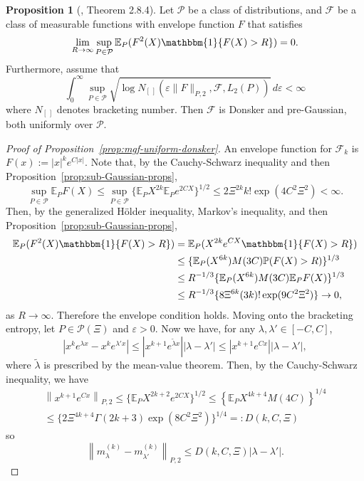 \documentclass{article}
\theoremstyle{definition}
\newtheorem{proposition}{Proposition}
\newcommand*\eps{\epsilon}
\renewcommand*\epsilon{\varepsilon}
\newcommand{\E}{\mathbb{E}}
\newcommand{\1}{\mathbbm{1}}
\renewcommand{\P}{\mathbb{P}}
\begin{document}
\begin{proposition}[\cite{vdv&w2012weak}, Theorem 2.8.4]
\label{prop:uniform-donkser}
    Let $\mathcal P$ be a class of distributions, and $\mathcal F$ be a class of measurable functions with envelope function $F$ that satisfies 
    \[
    \lim_{R \to \infty} \sup_{P \in \mathcal P} \E_P(F^2(X)\1\{F(X) > R\}) = 0.
    \]
    Furthermore, assume that 
    \[
    \int_0^\infty \sup_{P \in \mathcal P} \sqrt{\log N_{[\,]}(\eps \|F\|_{P, 2}, \mathcal F, L_2(P))} \, d\eps < \infty
    \]
    where $N_{[\,]}$ denotes bracketing number. Then $\mathcal F$ is Donsker and pre-Gaussian, both uniformly over $\mathcal P$.
\end{proposition}
\begin{proof}[Proof of Proposition~\ref{prop:mgf-uniform-donsker}]
    An envelope function for $\mathcal F_k$ is $F(x) := |x|^ke^{C|x|}$. Note that, by the Cauchy-Schwarz inequality and then Proposition~\ref{prop:sub-Gaussian-props},
    \[
    \sup_{P \in \mathcal P} \E_PF(X) \leq \sup_{P \in \mathcal P}\{\E_P X^{2k} \E_P e^{2CX}\}^{1/2} \leq 2\Xi^{2k}k! \exp(4C^2\Xi^2) < \infty.
    \]
    Then, by the generalized H\"older inequality, Markov's inequality, and then Proposition~\ref{prop:sub-Gaussian-props}, 
    \begin{align*}
        \E_P(F^2(X) \1\{F(X) > R\}) &= \E_P(X^{2k}e^{CX}\1\{F(X) > R\}) \\
        &\leq \{\E_P(X^{6k})M(3C)\P(F(X) > R)\}^{1/3} \\ 
        &\leq R^{-1/3} \{\E_P(X^{6k})M(3C)\E_P F(X)\}^{1/3} \\
        &\leq R^{-1/3}\{8\Xi^{6k}(3k)!\exp(9 C^2\Xi^2)\} \to 0,
    \end{align*}
    as $R \to \infty$. Therefore the envelope condition holds. Moving onto the bracketing entropy, let $P \in \mathcal P(\Xi)$ and $\eps > 0$. Now we have, for any $\lambda, \lambda' \in [-C, C]$,
\[
|x^ke^{\lambda x} - x^ke^{\lambda'x}| \leq |x^{k+1}e^{\tilde \lambda x}| |\lambda - \lambda'| \leq |x^{k+1}e^{Cx}||\lambda - \lambda'|,
\]
where $\tilde \lambda$ is prescribed by the mean-value theorem. Then, by the Cauchy-Schwarz inequality, we have 
\begin{multline}
    \left\|x^{k+1}e^{Cx}\right\|_{P, 2}\leq \{\E_P X^{2k+2}e^{2CX}\}^{1/2} \leq  \left\{\E_PX^{4k+4} M(4C)\right\}^{1/4} \\ \leq \{2\Xi^{4k+4}\Gamma(2k+3)\exp(8C^2\Xi^2)\}^{1/4} =: D(k, C, \Xi)
\end{multline}
so 
\[
\left\|m_\lambda^{(k)} - m^{(k)}_{\lambda'}\right\|_{P, 2} \leq D(k, C, \Xi)|\lambda - \lambda'|.
\]
\end{proof}
\end{document}
